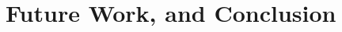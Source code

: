 \documentclass[10pt,twocolumn]{article}
\begin{document}
\begin{comment}
    Data bias. Like any machine learning project, the model is only as good (or as biased) as the data which is put in. The model receives data from Metacritic, GameSpot, and GiantBomb APIs. This means that it receives text data from verified reviewers who have write access to those websites, but it will not get the perspective of the average video game player. In terms of perspectives represented, then, the model overrepresents the critical perspective and ignores the average players' thoughts.

While some abusive content in annotated
datasets is openly hostile or inappropriate, ”edge cases”
such as ironic statements, slander/misinformation, and in-
tention of the speaker can change the classification.

    HOW TO ADDRESS: collect reviews from as many sources as possible, not just 1 individual API. Future work if more time was involved could include scraping review content from average players (from forums, Google reviews, etc.)

    Potential for abusive content. Any NLP application which uses natural language possibly has to contend with abusive content, which includes (but is not limited to) hate speech, casual racism/sexism/other discrimination, etc. Care has to be taken to make sure that this sort of speech is not learned and casually amplified by the model.

    HOW TO ADDRESS: not as relevant in this NLP app because strictly deck/description are used (not reviews). If reviews are used, there are ways to check for hate speech 

    n example of such error checking is to
ensure that the language provided by the user is not active
hate speech. Mathew et al. provide a benchmark dataset of
hate speech, tagging classification, community involved and
rationale of speaker. [5] Performing a search to ensure that
any provided input string is not found within the hate speech
dataset is one possible way to error check before the string
is forwarded to the algorithm. 

\end{comment}


\section{Future Work, and Conclusion}
\end{document}
